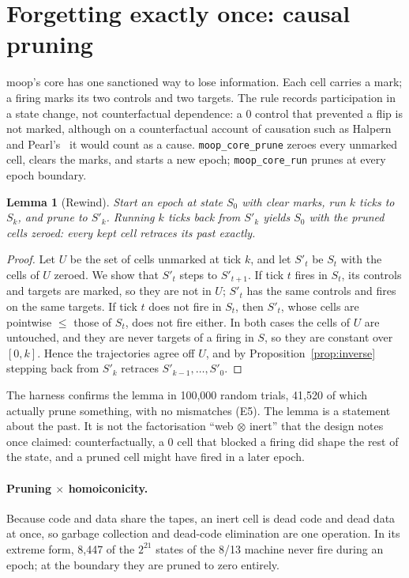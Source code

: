\documentclass[11pt]{article}
\newtheorem{lemma}[theorem]{Lemma}
\theoremstyle{definition}
\theoremstyle{remark}
\newcommand{\moop}{\textsf{moop}}
\newcommand{\code}[1]{\texttt{#1}}
\begin{document}
\section{Forgetting exactly once: causal pruning}
\label{sec:pruning}

\moop{}'s core has one sanctioned way to lose information. Each cell
carries a mark; a firing marks its two controls and two targets. The
rule records participation in a state change, not counterfactual
dependence: a 0 control that prevented a flip is not marked, although on
a counterfactual account of causation such as Halpern and
Pearl's~\cite{halpern2005} it would count as a cause. \code{moop\_core\_prune} zeroes every unmarked cell, clears the
marks, and starts a new epoch; \code{moop\_core\_run} prunes at every
epoch boundary.

\begin{lemma}[Rewind]
\label{lem:rewind}
Start an epoch at state $S_0$ with clear marks, run $k$ ticks to $S_k$,
and prune to $S'_k$. Running $k$ ticks back from $S'_k$ yields $S_0$ with
the pruned cells zeroed: every kept cell retraces its past exactly.
\end{lemma}
\begin{proof}
Let $U$ be the set of cells unmarked at tick $k$, and let $S'_t$ be $S_t$
with the cells of $U$ zeroed. We show that $S'_t$ steps to $S'_{t+1}$.
If tick $t$ fires in $S_t$, its controls and targets are marked, so they
are not in $U$; $S'_t$ has the same controls and fires on the same
targets. If tick $t$ does not fire in $S_t$, then $S'_t$, whose cells are
pointwise $\le$ those of $S_t$, does not fire either. In both cases the
cells of $U$ are untouched, and they are never targets of a firing in
$S$, so they are constant over $[0,k]$. Hence the trajectories agree off
$U$, and by Proposition~\ref{prop:inverse} stepping back from $S'_k$
retraces $S'_{k-1},\dots,S'_0$.
\end{proof}

The harness confirms the lemma in 100,000 random trials, 41,520 of which
actually prune something, with no mismatches (E5). The lemma is a
statement about the past. It is not the factorisation ``web $\otimes$
inert'' that the design notes once claimed: counterfactually, a 0 cell
that blocked a firing did shape the rest of the state, and a pruned cell
might have fired in a later epoch.

\paragraph{Pruning $\times$ homoiconicity.}
Because code and data share the tapes, an inert cell is dead code and
dead data at once, so garbage collection and dead-code elimination are
one operation. In its extreme form, 8,447 of the $2^{21}$ states of the
8/13 machine never fire during an epoch; at the boundary they are pruned
to zero entirely.
\end{document}
